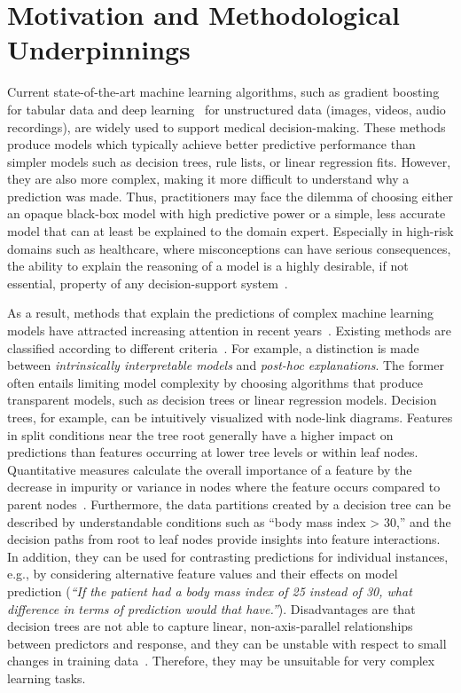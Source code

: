 \documentclass[
  oneside]{book}
\begin{document}
\hypertarget{iml-motivation}{%
\section{Motivation and Methodological Underpinnings}\label{iml-motivation}}

Current state-of-the-art machine learning algorithms, such as gradient boosting~\autocite{Friedman:PDP2001} for tabular data and deep learning~\autocite{Goodfellow:DL2016} for unstructured data (images, videos, audio recordings), are widely used to support medical decision-making.
These methods produce models which typically achieve better predictive performance than simpler models such as decision trees, rule lists, or linear regression fits.
However, they are also more complex, making it more difficult to understand why a prediction was made.
Thus, practitioners may face the dilemma of choosing either an opaque black-box model with high predictive power or a simple, less accurate model that can at least be explained to the domain expert.
Especially in high-risk domains such as healthcare, where misconceptions can have serious consequences, the ability to explain the reasoning of a model is a highly desirable, if not essential, property of any decision-support system~\autocite{guidotti2018survey,molnar2020interpretable}.

As a result, methods that explain the predictions of complex machine learning models have attracted increasing attention in recent years~\autocite{carvalho2019machine,adadi2018peeking}.
Existing methods are classified according to different criteria~\autocite{molnar2020interpretable}.
For example, a distinction is made between \emph{intrinsically interpretable models} and \emph{post-hoc explanations}.
The former often entails limiting model complexity by choosing algorithms that produce transparent models, such as decision trees or linear regression models.
Decision trees, for example, can be intuitively visualized with node-link diagrams.
Features in split conditions near the tree root generally have a higher impact on predictions than features occurring at lower tree levels or within leaf nodes.
Quantitative measures calculate the overall importance of a feature by the decrease in impurity or variance in nodes where the feature occurs compared to parent nodes~\autocite{kazemitabar2017variable}.
Furthermore, the data partitions created by a decision tree can be described by understandable conditions such as ``body mass index \textgreater{} 30,'' and the decision paths from root to leaf nodes provide insights into feature interactions.
In addition, they can be used for contrasting predictions for individual instances, e.g., by considering alternative feature values and their effects on model prediction (\emph{``If the patient had a body mass index of 25 instead of 30, what difference in terms of prediction would that have.''}).
Disadvantages are that decision trees are not able to capture linear, non-axis-parallel relationships between predictors and response, and they can be unstable with respect to small changes in training data~\autocite{hastie2009elements}.
Therefore, they may be unsuitable for very complex learning tasks.
\end{document}

